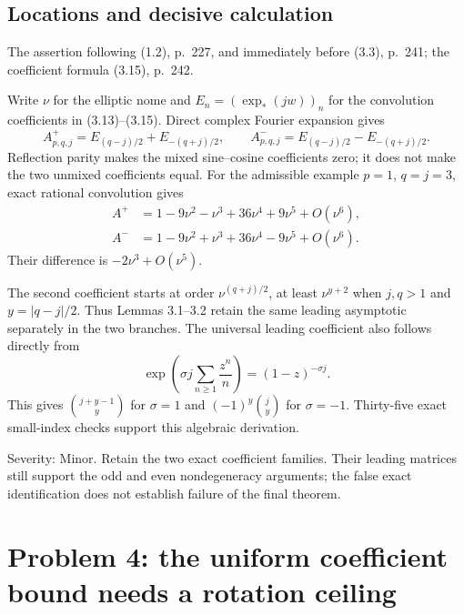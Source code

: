 \documentclass[10pt]{article}
\begin{document}
\subsection*{Locations and decisive calculation}
The assertion following (1.2), p. 227, and immediately before (3.3), p. 241; the coefficient formula (3.15), p. 242.\par
Write \(\nu\) for the elliptic nome and \(E_n=(\exp_*(jw))_n\) for the convolution coefficients in (3.13)–(3.15). Direct complex Fourier expansion gives \[A^+_{p,q,j}=E_{(q-j)/2}+E_{-(q+j)/2},
 \qquad
 A^-_{p,q,j}=E_{(q-j)/2}-E_{-(q+j)/2}.\] Reflection parity makes the mixed sine–cosine coefficients zero; it does not make the two unmixed coefficients equal. For the admissible example \(p=1\), \(q=j=3\), exact rational convolution gives \[\begin{aligned}
 A^+&=1-9\nu^2-\nu^3+36\nu^4+9\nu^5+O(\nu^6),\\
 A^-&=1-9\nu^2+\nu^3+36\nu^4-9\nu^5+O(\nu^6).\end{aligned}\] Their difference is \(-2\nu^3+O(\nu^5)\).\par
The second coefficient starts at order \(\nu^{(q+j)/2}\), at least \(\nu^{y+2}\) when \(j,q>1\) and \(y=|q-j|/2\). Thus Lemmas 3.1–3.2 retain the same leading asymptotic separately in the two branches. The universal leading coefficient also follows directly from \[\exp\!\left(\sigma j\sum_{n\geq1}\frac{z^n}{n}\right)
 =(1-z)^{-\sigma j}.\] This gives \(\binom{j+y-1}{y}\) for \(\sigma=1\) and \((-1)^y\binom jy\) for \(\sigma=-1\). Thirty-five exact small-index checks support this algebraic derivation.\par
Severity: Minor. Retain the two exact coefficient families. Their leading matrices still support the odd and even nondegeneracy arguments; the false exact identification does not establish failure of the final theorem.\par
\section*{Problem 4: the uniform coefficient bound needs a rotation ceiling}
\end{document}
